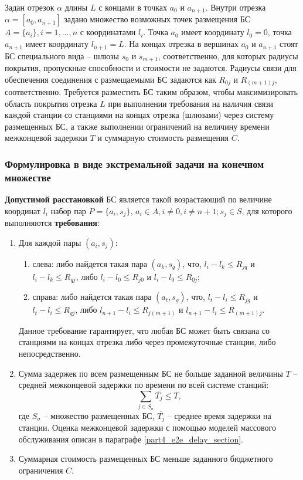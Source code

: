 Задан отрезок $\alpha$ длины $L$ с концами в точках $a_0$ и $a_{n+1}$. Внутри отрезка $\alpha = [a_0, a_{n+1}]$ задано множество возможных точек размещения БС $A=\{a_i \},i=1,...,n$ с координатами $l_i$. Точка $a_0$ имеет координату $l_0=0$, точка $a_{n+1}$ имеет координату $l_{n+1}=L$. На концах отрезка в вершинах $a_0$ и $a_{n+1}$ стоят БС специального вида -- шлюзы $s_0$ и $s_{m+1}$, соответственно, для которых радиусы покрытия, пропускные способности и стоимости не задаются. Радиусы связи для обеспечения соединения с размещаемыми БС задаются как $R_{0j}$ и $R_{(m+1)j}$, соответственно.
Требуется разместить БС таким образом, чтобы максимизировать область покрытия отрезка $L$ при выполнении требования на наличия связи каждой станции со станциями на концах отрезка (шлюзами) через систему размещенных БС, а также выполнении ограничений на величину времени межконцевой задержки $T$ и суммарную стоимость размещения $C$.


\subsubsection{Формулировка в виде экстремальной задачи на конечном множестве}

\textbf{Допустимой расстановкой} БС является такой возрастающий по величине координат $l_i$  набор пар $P = \{a_i, s_j\}, \, a_i \in A,i \neq 0,i \neq n+1;s_j \in S$, для которого выполняются \textbf{требования}:

\begin{enumerate}
  \item  Для каждой пары $(a_i,s_j)$:
      \begin{enumerate}
          \item слева: либо найдется такая пара $(a_k,s_q)$, что, $l_i - l_k \leqslant R_{jq}$  и $l_i - l_k  \leqslant R_{qj}$, либо $l_i-l_0 \leqslant R_{j0}$ и $l_i - l_0 \leqslant R_{0j}$;
          \item справа: либо найдется такая пара $(a_t,s_g)$, что, $l_t-l_i \leqslant R_{jg}$ и $l_t - l_i \leqslant R_{gj}$, либо $l_{n+1}-l_i \leqslant R_{j(m+1)}$ и $l_{n+1}-l_i \leqslant R_{(m+1)j}$. 
\end{enumerate}
Данное требование гарантирует, что любая БС может быть связана со станциями на концах отрезка либо через промежуточные станции, либо непосредственно.
  \item Сумма задержек по всем размещенным БС не больше заданной величины $T$ – средней межконцевой задержки по времени по всей системе станций:
  \begin{displaymath}
      \label{eq:part3_e2e_delay}
      \sum\limits_{j \in S_\sigma} \overline{T_j} \leqslant T,
  \end{displaymath}
где $S_\sigma$ – множество размещенных БС, $\overline{T_j}$ -- среднее время задержки на станции. Оценка межконцевой задержки с помощью моделей массового обслуживания описан в параграфе \cref{part4_e2e_delay_section}.
  \item Суммарная стоимость размещенных БС меньше заданного бюджетного ограничения  $C$.
\end{enumerate}


